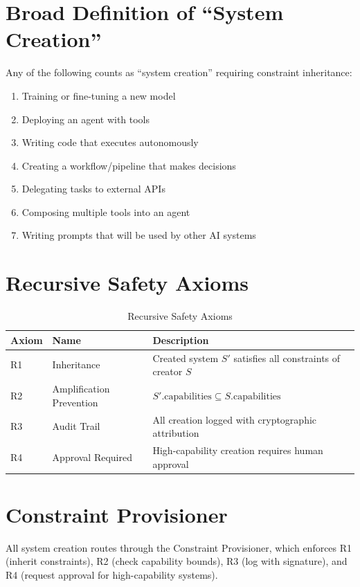 \documentclass[11pt,letterpaper]{article}
\theoremstyle{definition}
\theoremstyle{remark}
\begin{document}
\section{Broad Definition of ``System Creation''}

Any of the following counts as ``system creation'' requiring constraint inheritance:
\begin{enumerate}
\item Training or fine-tuning a new model
\item Deploying an agent with tools
\item Writing code that executes autonomously
\item Creating a workflow/pipeline that makes decisions
\item Delegating tasks to external APIs
\item Composing multiple tools into an agent
\item Writing prompts that will be used by other AI systems
\end{enumerate}

\section{Recursive Safety Axioms}

\begin{table}[h]
\centering
\begin{tabular}{@{}lll@{}}
\toprule
\textbf{Axiom} & \textbf{Name} & \textbf{Description} \\
\midrule
R1 & Inheritance & Created system $S'$ satisfies all constraints of creator $S$ \\
R2 & Amplification Prevention & $S'.\text{capabilities} \subseteq S.\text{capabilities}$ \\
R3 & Audit Trail & All creation logged with cryptographic attribution \\
R4 & Approval Required & High-capability creation requires human approval \\
\bottomrule
\end{tabular}
\caption{Recursive Safety Axioms}
\end{table}

\section{Constraint Provisioner}

All system creation routes through the Constraint Provisioner, which enforces R1 (inherit constraints), R2 (check capability bounds), R3 (log with signature), and R4 (request approval for high-capability systems).
\end{document}

